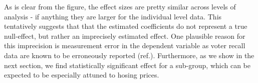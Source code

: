 \documentclass[12pt,a4paper]{article}
\begin{document}
	As is clear from the figure, the effect sizes are pretty similar across levels of analysis - if anything they are larger for the individual level data. This tentatively suggests that that the estimated coefficients do not represent a true null-effect, but rather an imprecisely estimated effect. One plausible reason for this imprecision is measurement error in the dependent variable as voter recall data are known to be erroneously reported (ref.). Furthermore, as we show in the next section, we find statistically significant effect for a sub-group, which can be expected to be especially attuned to hosing prices.
	
	
\end{document}
